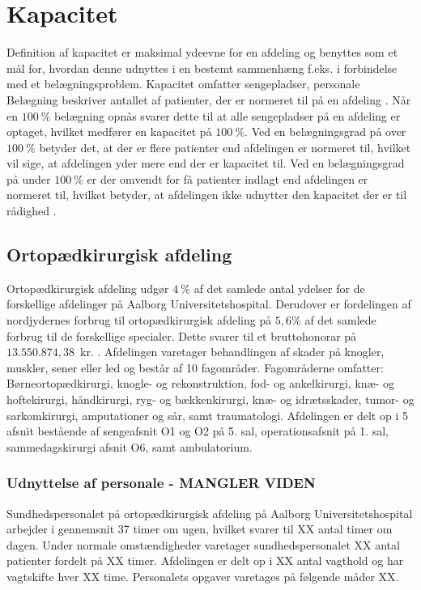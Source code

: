 \section{Kapacitet}
Definition af kapacitet er maksimal ydeevne for en afdeling og benyttes som et mål for, hvordan denne udnyttes i en bestemt sammenhæng f.eks. i forbindelse med et belægningsproblem. Kapacitet omfatter sengepladser, personale 
Belægning beskriver antallet af patienter, der er normeret til på en afdeling \cite{Heidmann2014}. Når en $100~\%$ belægning opnås svarer dette til at alle sengepladser på en afdeling er optaget, hvilket medfører en kapacitet på $100~\%$. Ved en belægningsgrad på over $100~\%$ betyder det, at der er flere patienter end afdelingen er normeret til, hvilket vil sige, at afdelingen yder mere end der er kapacitet til. Ved en belægningsgrad på under $100~\%$ er der omvendt for få  patienter indlagt end afdelingen er normeret til, hvilket betyder, at afdelingen ikke udnytter den kapacitet der er til rådighed . 

\subsection{Ortopædkirurgisk afdeling}
Ortopædkirurgisk afdeling udgør $4~\%$ af det samlede antal ydelser for de forskellige afdelinger på Aalborg Universitetshospital. Derudover er fordelingen af nordjydernes forbrug til ortopædkirurgisk afdeling på $5,6\%$ af det samlede forbrug til de forskellige specialer. Dette svarer til et bruttohonorar på $13.550.874,38$~kr. \cite{RegionNord2016}. Afdelingen varetager behandlingen af skader på knogler, muskler, sener eller led og består af 10 fagområder. Fagområderne omfatter: Børneortopædkirurgi, knogle- og rekonstruktion, fod- og ankelkirurgi, knæ- og hoftekirurgi, håndkirurgi, ryg- og bækkenkirurgi, knæ- og idrætsskader, tumor- og sarkomkirurgi, amputationer og sår, samt traumatologi. Afdelingen er delt op i 5 afsnit bestående af sengeafsnit O1 og O2 på 5. sal, operationsafsnit på 1. sal, sammedagskirurgi afsnit O6, samt ambulatorium. \cite{Aalborg2016}


\subsubsection{Udnyttelse af personale - MANGLER VIDEN} 
Sundhedspersonalet på ortopædkirurgisk afdeling på Aalborg Universitetshospital arbejder i gennemsnit 37 timer om ugen, hvilket svarer til XX antal timer om dagen. Under normale omstændigheder varetager sundhedspersonalet XX antal patienter fordelt på XX timer. \cite{Danske2015} Afdelingen er delt op i XX antal vagthold og har vagtskifte hver XX time. Personalets opgaver varetages på følgende måder XX.

